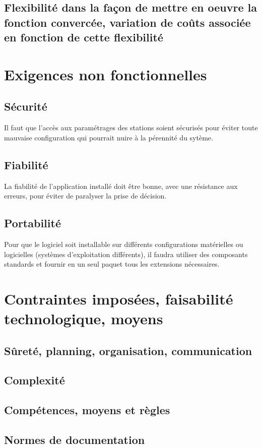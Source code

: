 \subsection{Flexibilité dans la façon de mettre en oeuvre la fonction convercée, variation de coûts associée en fonction de cette flexibilité}

\section{Exigences non fonctionnelles}
\subsection{Sécurité}
Il faut que l'accès aux paramétrages des stations soient sécurisés pour éviter toute mauvaise configuration qui pourrait nuire à la pérennité du sytème.

\subsection{Fiabilité}
La fiabilité de l'application installé doit être bonne, avec une résistance aux erreurs, pour éviter de paralyser la prise de décision.

\subsection{Portabilité}
Pour que le logiciel soit installable sur différents configurations matérielles ou logicielles (systèmes d'exploitation différents), il faudra utiliser des composants standards et fournir en un seul paquet tous les extensions nécessaires.

\section{Contraintes imposées, faisabilité technologique, moyens}
\subsection{Sûreté, planning, organisation, communication}
\subsection{Complexité}
\subsection{Compétences, moyens et règles}
\subsection{Normes de documentation}

